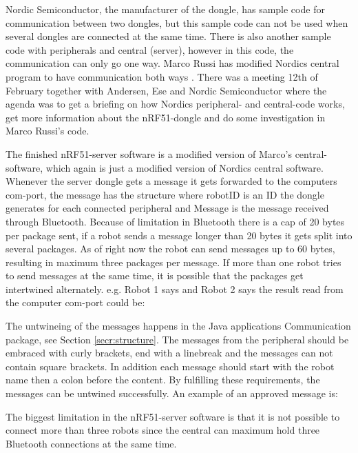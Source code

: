 Nordic Semiconductor, the manufacturer of the dongle, has sample code for communication between two dongles, but this sample code can not be used when several dongles are connected at the same time. There is also another sample code with peripherals and central (server), however in this code, the communication can only go one way. Marco Russi has modified Nordics central program to have communication both ways \cite{marcoRussi}. There was a meeting 12th of February together with Andersen, Ese and Nordic Semiconductor where the agenda was to get a briefing on how Nordics peripheral- and central-code works, get more information about the nRF51-dongle and do some investigation in Marco Russi's code.

The finished nRF51-server software is a modified version of Marco's central-software, which again is just a modified version of Nordics central software. Whenever the server dongle gets a message it gets forwarded to the computers \acrshort{com}-port, the message has the structure  where robotID is an ID the dongle generates for each connected peripheral and Message is the message received through Bluetooth. Because of limitation in Bluetooth there is a cap of 20 bytes per package sent, if a robot sends a message longer than 20 bytes it gets split into several packages. As of right now the robot can send messages up to 60 bytes, resulting in maximum three packages per message. If more than one robot tries to send messages at the same time, it is possible that the packages get intertwined alternately. e.g. Robot 1 says  and Robot 2 says  the result read from the computer \acrshort{com}-port could be: 

The untwineing of the messages happens in the Java applications Communication package, see Section \ref{secr:structure}. The messages from the peripheral should be embraced with curly brackets, end with a linebreak and the messages can not contain square brackets. In addition each message should start with the robot name then a colon before the content. By fulfilling these requirements, the messages can be untwined successfully. An example of an approved message is: 

The biggest limitation in the nRF51-server software is that it is not possible to connect more than three robots since the central can maximum hold three Bluetooth connections at the same time.